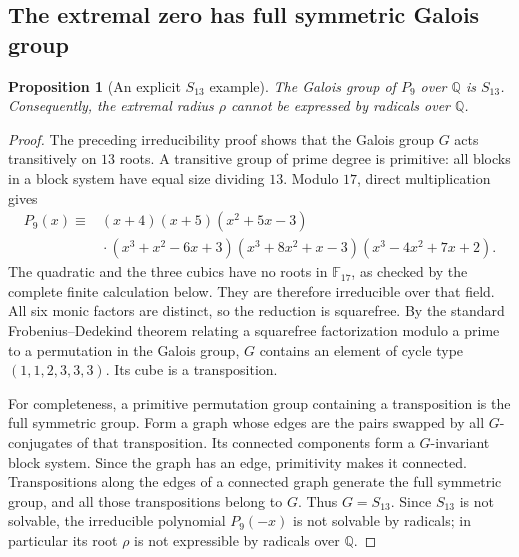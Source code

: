 \documentclass[11pt,a4paper]{article}
\newtheorem{proposition}[theorem]{Proposition}
\theoremstyle{definition}
\theoremstyle{remark}
\numberwithin{equation}{section}
\begin{document}
\subsection{The extremal zero has full symmetric Galois group}

\begin{proposition}[An explicit $S_{13}$ example]
\label{C:prop:extremal-galois}
The Galois group of $P_9$ over $\mathbb Q$ is $S_{13}$.
Consequently, the extremal radius $\rho$ cannot be expressed by radicals
over $\mathbb Q$.
\end{proposition}
\begin{proof}
The preceding irreducibility proof shows that the Galois group $G$
acts transitively on $13$ roots. A transitive group of prime degree is
primitive: all blocks in a block system have equal size dividing $13$.
Modulo $17$, direct multiplication gives
\begin{align*}
P_9(x)\equiv{}&(x+4)(x+5)(x^2+5x-3)\\
&\mathord{}\cdot(x^3+x^2-6x+3)
(x^3+8x^2+x-3)(x^3-4x^2+7x+2).
\end{align*}
The quadratic and the three cubics have no roots in $\mathbb F_{17}$,
as checked by the complete finite calculation below. They are therefore
irreducible over that field. All six monic factors are distinct, so the
reduction is squarefree. By the standard Frobenius--Dedekind theorem
\cite{R075} relating a squarefree factorization modulo a prime to a permutation in
the Galois group, $G$ contains an element of cycle type
$(1,1,2,3,3,3)$. Its cube is a transposition.

For completeness, a primitive permutation group containing a
transposition is the full symmetric group. Form a graph whose edges
are the pairs swapped by all $G$-conjugates of that transposition.
Its connected components form a $G$-invariant block system. Since the
graph has an edge, primitivity makes it connected. Transpositions along
the edges of a connected graph generate the full symmetric group, and
all those transpositions belong to $G$. Thus $G=S_{13}$.
Since $S_{13}$ is not solvable, the irreducible polynomial $P_9(-x)$
is not solvable by radicals; in particular its root $\rho$ is not
expressible by radicals over $\mathbb Q$.
\end{proof}
\end{document}
